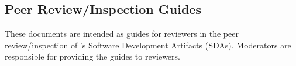 \begin{appendix}

    \section{Peer Review/Inspection Guides}
    These documents are intended as guides for reviewers in the peer
    review/inspection of \progname{}'s Software Development Artifacts (SDAs).
    Moderators are responsible for providing the guides to reviewers.

    

    \clearpage

    

    \clearpage

    

    \clearpage

    

    \clearpage

    

    \clearpage

    

    \clearpage

    

\end{appendix}